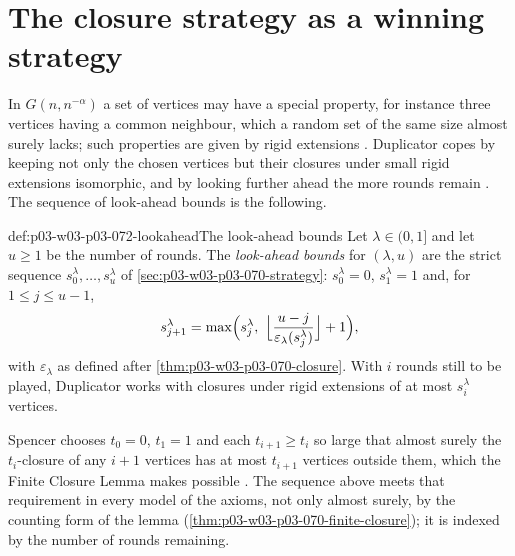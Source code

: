 \section{The closure strategy as a winning strategy}
\label{sec:p03-w03-p03-072-closure}

In \(G(n,n^{-\alpha})\) a set of vertices may have a special property, for
instance three vertices having a common neighbour, which a random set of
the same size almost surely lacks; such properties are given by rigid
extensions \cite[pp.~7--8]{Spencer2007LogicRandomStructuresAuthor}.
Duplicator copes by keeping not only the chosen vertices but their closures
under small rigid extensions isomorphic, and by looking further ahead the
more rounds remain \cite[pp.~11--12]{Spencer2007LogicRandomStructuresAuthor}.
The sequence of look-ahead bounds is the following.

\begin{hbdefinition}{def:p03-w03-p03-072-lookahead}{The look-ahead bounds}
Let \(\lambda\in(0,1]\) and let \(u\geq1\) be the number of rounds.  The
\emph{look-ahead bounds} for \((\lambda,u)\) are the strict sequence
\(s^\lambda_0,\ldots,s^\lambda_u\) of \cref{sec:p03-w03-p03-070-strategy}:
\(s^\lambda_0=0\), \(s^\lambda_1=1\) and, for \(1\leq j\leq u-1\),
\[
  s^\lambda_{j+1}=\max\Bigl(s^\lambda_j,\
  \Bigl\lfloor\frac{u-j}{\varepsilon_\lambda(s^\lambda_j)}\Bigr\rfloor+1\Bigr),
\]
with \(\varepsilon_\lambda\) as defined after
\cref{thm:p03-w03-p03-070-closure}.  With \(i\) rounds still to be played,
Duplicator works with closures under rigid extensions of at most
\(s^\lambda_i\) vertices.
\end{hbdefinition}

Spencer chooses \(t_0=0\), \(t_1=1\) and each \(t_{i+1}\geq t_i\) so large
that almost surely the \(t_i\)-closure of any \(i+1\) vertices has at most
\(t_{i+1}\) vertices outside them, which the Finite Closure Lemma makes
possible \cite[p.~11]{Spencer2007LogicRandomStructuresAuthor}.  The
sequence above meets that requirement in every model of the axioms, not
only almost surely, by the counting form of the lemma
(\cref{thm:p03-w03-p03-070-finite-closure}); it is indexed by the number of
rounds remaining.

